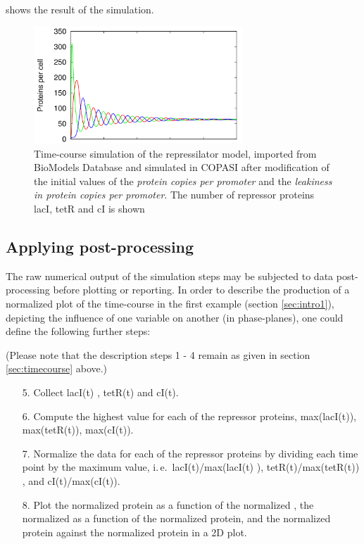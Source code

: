  shows the result of the simulation.

\begin{figure}[H]
\centering
\includegraphics[width=0.7\textwidth]{examples/rep_pre.png}
\caption{Time-course simulation of the repressilator model, imported from BioModels Database and simulated in COPASI after modification of the initial values of the \emph{protein copies per promoter} and the \emph{leakiness in protein copies per promoter}. The number of repressor proteins lacI, tetR and cI is shown}
\label{fig:rep_pre}
\end{figure}

\subsection{Applying post-processing}
\label{sec:postprocessing}
The raw numerical output of the simulation steps may be subjected to data post-processing before plotting or reporting.  In order to describe the production of a normalized plot of the time-course in the first example (section \ref{sec:intro1}), depicting the influence of one variable on another (in phase-planes), one could define the following further steps:

(Please note that the description steps 1 - 4 remain as given in section \ref{sec:timecourse} above.)
\begin{enumerate}
\item[5.]{Collect lacI(t) , tetR(t) and cI(t).}
\item[6.]{Compute the highest value for each of the repressor proteins,  max(lacI(t)), max(tetR(t)), max(cI(t)).}
\item[7.]{Normalize the data for each of the repressor proteins by dividing each time point by the maximum value, i.\,e.\ lacI(t)/max(lacI(t) ), tetR(t)/max(tetR(t)) , and cI(t)/max(cI(t)).}
\item[8.]{Plot the normalized  protein as a function of the normalized , the normalized   as a function of the normalized  protein, and the normalized  protein against the normalized  protein in a 2D plot.}
\end{enumerate}


